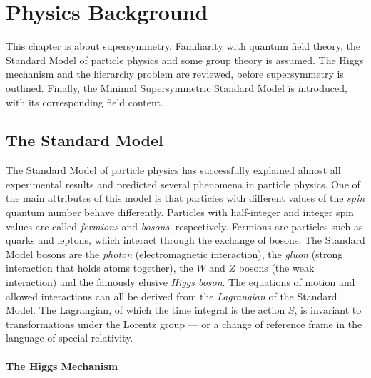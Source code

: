 \documentclass[twoside,english]{uiofysmaster}
\begin{document}
\tableofcontents


\chapter{Physics Background}

This chapter is about supersymmetry. Familiarity with quantum field theory, the Standard Model of particle physics and some group theory is assumed. The Higgs mechanism and the hierarchy problem are reviewed, before supersymmetry is outlined. Finally, the Minimal Supersymmetric Standard Model is introduced, with its corresponding field content.

\section{The Standard Model}

The Standard Model of particle physics has successfully explained almost all experimental results and predicted several phenomena in particle physics. One of the main attributes of this model is that particles with different values of the \textit{spin} quantum number behave differently. Particles with half-integer and integer spin values are called \textit{fermions} and \textit{bosons}, respectively. Fermions are particles such as quarks and leptons, which interact through the exchange of bosons. The Standard Model bosons are the \textit{photon} (electromagnetic interaction), the \textit{gluon} (strong interaction that holds atoms together), the $W$ and $Z$ bosons (the weak interaction) and the famously elusive \textit{Higgs boson}. The equations of motion and allowed interactions can all be derived from the \textit{Lagrangian} of the Standard Model. The Lagrangian, of which the time integral is the action $S$, is invariant to transformations under the Lorentz group --- or a change of reference frame in the language of special relativity. 


\subsubsection{The Higgs Mechanism}
\end{document}
